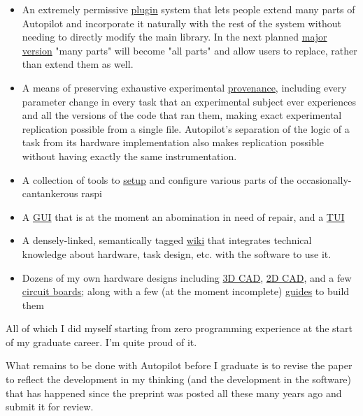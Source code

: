 \begin{done}
\begin{itemize}
\item An extremely permissive \href{https://docs.auto-pi-lot.com/en/latest/guide/plugins.html}{plugin} system that lets people extend many parts of Autopilot and incorporate it naturally with the rest of the system without needing to directly modify the main library. In the next planned \href{https://github.com/wehr-lab/autopilot/milestone/2}{major version} "many parts" will become "all parts" and allow users to replace, rather than extend them as well.
\item A means of preserving exhaustive experimental \href{https://docs.auto-pi-lot.com/en/latest/core/subject.html}{provenance}, including every parameter change in every task that an experimental subject ever experiences and all the versions of the code that ran them, making exact experimental replication possible from a single file. Autopilot's separation of the logic of a task from its hardware implementation also makes replication possible without having exactly the same instrumentation.
\item A collection of tools to \href{https://docs.auto-pi-lot.com/en/latest/setup/index.html}{setup} and configure various parts of the occasionally-cantankerous raspi
\item A \href{https://docs.auto-pi-lot.com/en/latest/core/terminal.html}{GUI} that is at the moment an abomination in need of repair, and a \href{https://docs.auto-pi-lot.com/en/latest/guide/installation.html#configuration}{TUI}
\item A densely-linked, semantically tagged \href{https://wiki.auto-pi-lot.com/index.php/Autopilot_Wiki}{wiki} that integrates technical knowledge about hardware, task design, etc. with the software to use it. 
\item Dozens of my own hardware designs including \href{https://wiki.auto-pi-lot.com/index.php/3D_CAD}{3D CAD}, \href{https://wiki.auto-pi-lot.com/index.php/2D_CAD}{2D CAD}, and a few \href{https://wiki.auto-pi-lot.com/index.php/PCBs}{circuit boards}; along with a few (at the moment incomplete) \href{https://wiki.auto-pi-lot.com/index.php/Guides}{guides} to build them
\end{itemize}

\end{done}

All of which I did myself starting from zero programming experience at the start of my graduate career. I'm quite proud of it.

\begin{todo}
\label{todo:autopilot}
What remains to be done with Autopilot before I graduate is to revise the paper to reflect the development in my thinking (and the development in the software) that has happened since the preprint was posted all these many years ago and submit it for review. 
\end{todo}


